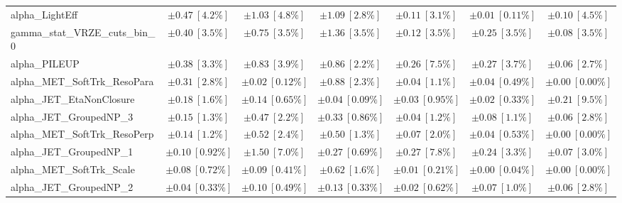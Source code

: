 \begin{sidewaystable}
\begin{center}
\begin{tabular*}{\textwidth}{@{\extracolsep{\fill}}lcccccc}
alpha\_LightEff         & $\pm 0.47\ [4.2\%] $          & $\pm 1.03\ [4.8\%] $          & $\pm 1.09\ [2.8\%] $          & $\pm 0.11\ [3.1\%] $          & $\pm 0.01\ [0.11\%] $          & $\pm 0.10\ [4.5\%] $       \\
gamma\_stat\_VRZE\_cuts\_bin\_0         & $\pm 0.40\ [3.5\%] $          & $\pm 0.75\ [3.5\%] $          & $\pm 1.36\ [3.5\%] $          & $\pm 0.12\ [3.5\%] $          & $\pm 0.25\ [3.5\%] $          & $\pm 0.08\ [3.5\%] $       \\
alpha\_PILEUP         & $\pm 0.38\ [3.3\%] $          & $\pm 0.83\ [3.9\%] $          & $\pm 0.86\ [2.2\%] $          & $\pm 0.26\ [7.5\%] $          & $\pm 0.27\ [3.7\%] $          & $\pm 0.06\ [2.7\%] $       \\
alpha\_MET\_SoftTrk\_ResoPara         & $\pm 0.31\ [2.8\%] $          & $\pm 0.02\ [0.12\%] $          & $\pm 0.88\ [2.3\%] $          & $\pm 0.04\ [1.1\%] $          & $\pm 0.04\ [0.49\%] $          & $\pm 0.00\ [0.00\%] $       \\
alpha\_JET\_EtaNonClosure         & $\pm 0.18\ [1.6\%] $          & $\pm 0.14\ [0.65\%] $          & $\pm 0.04\ [0.09\%] $          & $\pm 0.03\ [0.95\%] $          & $\pm 0.02\ [0.33\%] $          & $\pm 0.21\ [9.5\%] $       \\
alpha\_JET\_GroupedNP\_3         & $\pm 0.15\ [1.3\%] $          & $\pm 0.47\ [2.2\%] $          & $\pm 0.33\ [0.86\%] $          & $\pm 0.04\ [1.2\%] $          & $\pm 0.08\ [1.1\%] $          & $\pm 0.06\ [2.8\%] $       \\
alpha\_MET\_SoftTrk\_ResoPerp         & $\pm 0.14\ [1.2\%] $          & $\pm 0.52\ [2.4\%] $          & $\pm 0.50\ [1.3\%] $          & $\pm 0.07\ [2.0\%] $          & $\pm 0.04\ [0.53\%] $          & $\pm 0.00\ [0.00\%] $       \\
alpha\_JET\_GroupedNP\_1         & $\pm 0.10\ [0.92\%] $          & $\pm 1.50\ [7.0\%] $          & $\pm 0.27\ [0.69\%] $          & $\pm 0.27\ [7.8\%] $          & $\pm 0.24\ [3.3\%] $          & $\pm 0.07\ [3.0\%] $       \\
alpha\_MET\_SoftTrk\_Scale         & $\pm 0.08\ [0.72\%] $          & $\pm 0.09\ [0.41\%] $          & $\pm 0.62\ [1.6\%] $          & $\pm 0.01\ [0.21\%] $          & $\pm 0.00\ [0.04\%] $          & $\pm 0.00\ [0.00\%] $       \\
alpha\_JET\_GroupedNP\_2         & $\pm 0.04\ [0.33\%] $          & $\pm 0.10\ [0.49\%] $          & $\pm 0.13\ [0.33\%] $          & $\pm 0.02\ [0.62\%] $          & $\pm 0.07\ [1.0\%] $          & $\pm 0.06\ [2.8\%] $       \\

\end{tabular*}
\end{center}
\end{sidewaystable}
